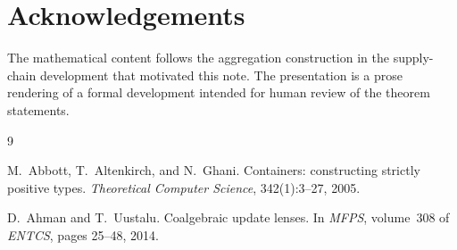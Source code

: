 \documentclass[11pt,a4paper]{article}
\theoremstyle{plain}
\theoremstyle{definition}
\begin{document}
\section*{Acknowledgements}

The mathematical content follows the aggregation construction in the
supply-chain development that motivated this note. The presentation is a prose
rendering of a formal development intended for human review of the theorem
statements.

\begin{thebibliography}{9}

M.~Abbott, T.~Altenkirch, and N.~Ghani.
\newblock Containers: constructing strictly positive types.
\newblock \emph{Theoretical Computer Science}, 342(1):3--27, 2005.

D.~Ahman and T.~Uustalu.
\newblock Coalgebraic update lenses.
\newblock In \emph{MFPS}, volume~308 of \emph{ENTCS}, pages 25--48, 2014.

\end{thebibliography}
\end{document}
